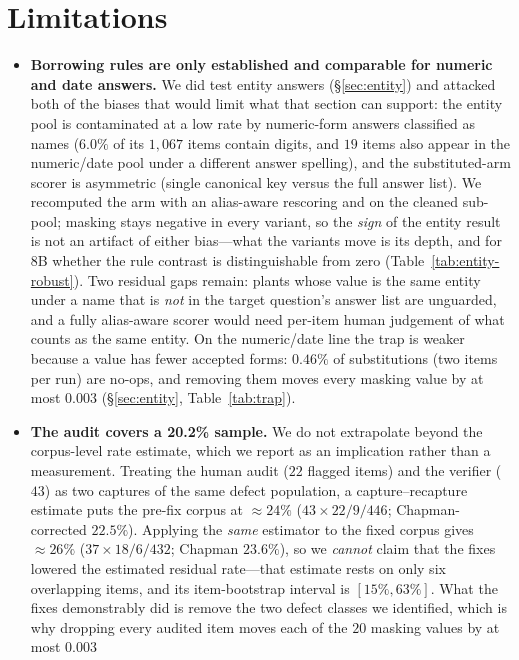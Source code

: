 \documentclass[11pt]{article}
\begin{document}
\section{Limitations}
\begin{itemize}\itemsep2pt
\item \textbf{Borrowing rules are only established and comparable for numeric and date
answers.} We did test entity answers (\S\ref{sec:entity}) and attacked both of the biases that
would limit what that section can support: the entity pool is contaminated at a low rate by
numeric-form answers classified as names ($6.0\%$ of its $1{,}067$ items contain digits, and
$19$ items also appear in the numeric/date pool under a different answer spelling), and the
substituted-arm scorer is asymmetric (single canonical key versus the full answer list). We
recomputed the arm with an alias-aware rescoring and on the cleaned sub-pool; masking stays
negative in every variant, so the \emph{sign} of the entity result is not an artifact of either
bias---what the variants move is its depth, and for 8B whether the rule contrast is
distinguishable from zero (Table~\ref{tab:entity-robust}). Two residual gaps remain: plants
whose value is the same entity under a name that is \emph{not} in the target question's answer
list are unguarded, and a fully alias-aware scorer would need per-item human judgement of what
counts as the same entity. On the numeric/date line the trap is weaker because a value has
fewer accepted forms: $0.46\%$ of substitutions (two items per run) are no-ops, and removing
them moves every masking value by at most $0.003$ (\S\ref{sec:entity}, Table~\ref{tab:trap}).
\item \textbf{The audit covers a 20.2\% sample.} We do not extrapolate beyond the
corpus-level rate estimate, which we report as an implication rather than a measurement.
Treating the human audit ($22$ flagged items) and the verifier ($43$) as two captures of the
same defect population, a capture--recapture estimate puts the pre-fix corpus at
$\approx 24\%$ ($43\times22/9/446$; Chapman-corrected $22.5\%$). Applying the \emph{same}
estimator to the fixed corpus gives $\approx 26\%$ ($37\times18/6/432$; Chapman $23.6\%$), so
we \emph{cannot} claim that the fixes lowered the estimated residual rate---that estimate
rests on only six overlapping items, and its item-bootstrap interval is $[15\%,63\%]$. What
the fixes demonstrably did is remove the two defect classes we identified, which is why
dropping every audited item moves each of the $20$ masking values by at most $0.003$

\end{itemize}
\end{document}
